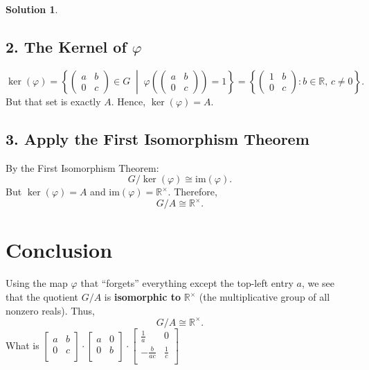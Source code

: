 \documentclass[12pt]{article}
\theoremstyle{definition} %
\newtheorem{solution}{Solution}
\theoremstyle{plain} %
\begin{document}
\begin{solution}
\subsection*{2. The Kernel of \( \varphi \)}

\[
\ker(\varphi)
= \left\{
\begin{pmatrix}
a & b \\
0 & c
\end{pmatrix}
\in G
\;\middle|\;
\varphi\left(\begin{pmatrix}
a & b \\
0 & c
\end{pmatrix}\right) = 1
\right\}
= \left\{
\begin{pmatrix}
1 & b \\
0 & c
\end{pmatrix}
: b \in \mathbb{R},\, c \neq 0
\right\}.
\]
But that set is exactly \( A \). Hence, \( \ker(\varphi) = A \).

\subsection*{3. Apply the First Isomorphism Theorem}

By the First Isomorphism Theorem:
\[
G / \ker(\varphi)
\cong
\mathrm{im}(\varphi).
\]
But \( \ker(\varphi) = A \) and \( \mathrm{im}(\varphi) = \mathbb{R}^\times \).  
Therefore,
\[
G / A \cong \mathbb{R}^\times.
\]

\section*{Conclusion}

Using the map \( \varphi \) that “forgets” everything except the top-left entry \( a \), we see that the quotient \( G / A \) is \textbf{isomorphic to} \( \mathbb{R}^\times \) (the multiplicative group of all nonzero reals). Thus,
\[
\boxed{G / A \cong \mathbb{R}^\times.}
\]
What is $\begin{bmatrix}
    a &  b \\
    0 &  c \\
\end{bmatrix}\cdot \begin{bmatrix}
    a &  0 \\
    0 &  b \\
\end{bmatrix}\cdot \begin{bmatrix}
    \frac{1}{a} & 0  \\
     -\frac{b}{ac}&\frac{1}{c}   \\
\end{bmatrix}$ 
\end{solution}
\end{document}
